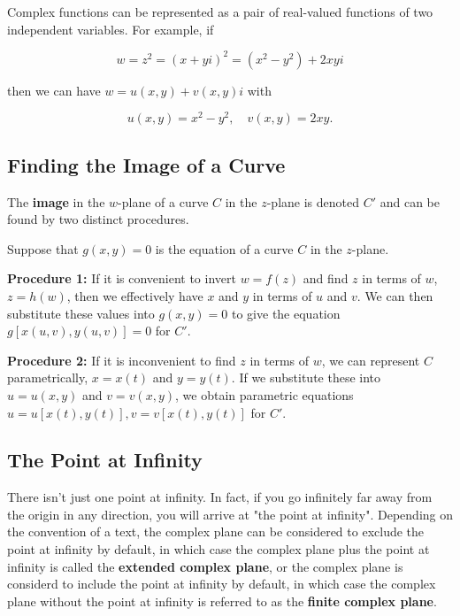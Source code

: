 \documentclass{article}
\begin{document}
Complex functions can be represented as a pair of real-valued functions of two independent variables. For example, if

\[ w = z^2 = (x+yi)^2 = (x^2 - y^2) + 2xyi \]

then we can have $ w = u(x,y) + v(x,y)i $ with 

\[ u(x,y) = x^2 - y^2, \quad v(x,y) = 2xy. \]

\subsection{Finding the Image of a Curve}

The \textbf{image} in the $w$-plane of a curve $C$ in the $z$-plane is denoted $C'$ and can be found by two distinct procedures.

Suppose that $g(x,y) = 0$ is the equation of a curve $C$ in the $z$-plane.

\textbf{Procedure 1:} If it is convenient to invert $w = f(z)$ and find $z$ in terms of $w$, $z = h(w)$, then we effectively have $x$ and $y$ in terms of $u$ and $v$. We can then substitute these values into $g(x,y) = 0$ to give the equation $g[x(u,v), y(u,v)] = 0$ for $C'$.

\textbf{Procedure 2:} If it is inconvenient to find $z$ in terms of $w$, we can represent $C$ parametrically, $x = x(t)$ and $y = y(t)$. If we substitute these into $u = u(x,y)$ and $v = v(x,y)$, we obtain parametric equations $u = u[x(t), y(t)], v = v[x(t), y(t)]$ for $C'$.

\subsection{The Point at Infinity}

There isn't just one point at infinity. In fact, if you go infinitely far away from the origin in any direction, you will arrive at "the point at infinity". Depending on the convention of a text, the complex plane can be considered to exclude the point at infinity by default, in which case the complex plane plus the point at infinity is called the \textbf{extended complex plane}, or the complex plane is considerd to include the point at infinity by default, in which case the complex plane without the point at infinity is referred to as the \textbf{finite complex plane}.
\end{document}
